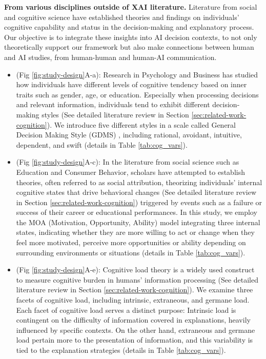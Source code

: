 \textbf{From various disciplines outside of XAI literature.} Literature from social and cognitive science have established theories and findings on individuals' cognitive capability and status in the decision-making and explanatory process. Our objective is to integrate these insights into AI decision contexts, to not only theoretically support our framework but also make connections between human and AI studies, from human-human and human-AI communication.

\begin{itemize}
    \item \textbf{} (Fig \ref{fig:study-design}A-a): Research in Psychology and Business has studied how individuals have different levels of cognitive tendency based on inner traits such as gender, age, or education. Especially when processing decisions and relevant information, individuals tend to exhibit different decision-making styles (See detailed literature review in Section \ref{sec:related-work-cognition}). We introduce five different styles in a scale called General Decision Making Style (GDMS) \cite{examinationgeneraldecisionmakingstyle}, including rational, avoidant, intuitive, dependent, and swift (details in Table \ref{tab:cog_vars}).
    \item \textbf{} (Fig \ref{fig:study-design}A-c): In the literature from social science such as Education and Consumer Behavior, scholars have attempted to establish theories, often referred to as social attribution, theorizing individuals' internal cognitive states that drive behavioral changes (See detailed literature review in Section \ref{sec:related-work-cognition}) triggered by events such as a failure or success of their career or educational performances. In this study, we employ the MOA (Motivation, Opportunity, Ability) model \cite{EnhancingMeasuringConsumersMotivationOpportunity, jepson2018applying, fazio2014attitude} integrating three internal states, indicating whether they are more willing to act or change when they feel more motivated, perceive more opportunities or ability depending on surrounding environments or situations (details in Table \ref{tab:cog_vars}).
    \item \textbf{} (Fig \ref{fig:study-design}A-e): Cognitive load theory is a widely used construct to measure cognitive burden in humans’ information processing  (See detailed literature review in Section \ref{sec:related-work-cognition}). We examine three facets of cognitive load, including intrinsic, extraneous, and germane load. Each facet of cognitive load serves a distinct purpose: Intrinsic load is contingent on the difficulty of information covered in explanations, heavily influenced by specific contexts. On the other hand, extraneous and germane load pertain more to the presentation of information, and this variability is tied to the explanation strategies (details in Table \ref{tab:cog_vars}).
\end{itemize}

